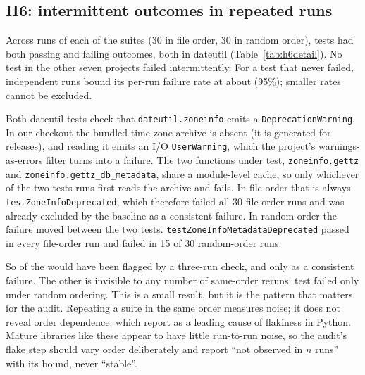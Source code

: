 \subsection{H6: intermittent outcomes in repeated runs}

Across \HSixRuns{} runs of each of the \HSixProjects{} suites (30 in file order, 30 in random order), \HSixIntermittent{} tests had both passing and failing outcomes, both in dateutil (Table~\ref{tab:h6detail}). No test in the other seven projects failed intermittently. For a test that never failed, \HSixRuns{} independent runs bound its per-run failure rate at about \HSixUpper{} (95\%); smaller rates cannot be excluded.

Both dateutil tests check that \texttt{dateutil.zoneinfo} emits a \texttt{DeprecationWarning}. In our checkout the bundled time-zone archive is absent (it is generated for releases), and reading it emits an I/O \texttt{UserWarning}, which the project's warnings-as-errors filter turns into a failure. The two functions under test, \texttt{zoneinfo.gettz} and \texttt{zoneinfo.gettz\_db\_metadata}, share a module-level cache, so only whichever of the two tests runs first reads the archive and fails. In file order that is always \texttt{testZoneInfoDeprecated}, which therefore failed all 30 file-order runs and was already excluded by the baseline as a consistent failure. In random order the failure moved between the two tests. \texttt{testZoneInfoMetadataDeprecated} passed in every file-order run and failed in 15 of 30 random-order runs.

So \HSixCaughtByThree{} of the \HSixIntermittent{} would have been flagged by a three-run check, and only as a consistent failure. The other is invisible to any number of same-order reruns: \HSixRandomOnly{} test failed only under random ordering. This is a small result, but it is the pattern that matters for the audit. Repeating a suite in the same order measures noise; it does not reveal order dependence, which \citet{gruber2021flaky} report as a leading cause of flakiness in Python. Mature libraries like these appear to have little run-to-run noise, so the audit's flake step should vary order deliberately and report ``not observed in $n$ runs'' with its bound, never ``stable''.


